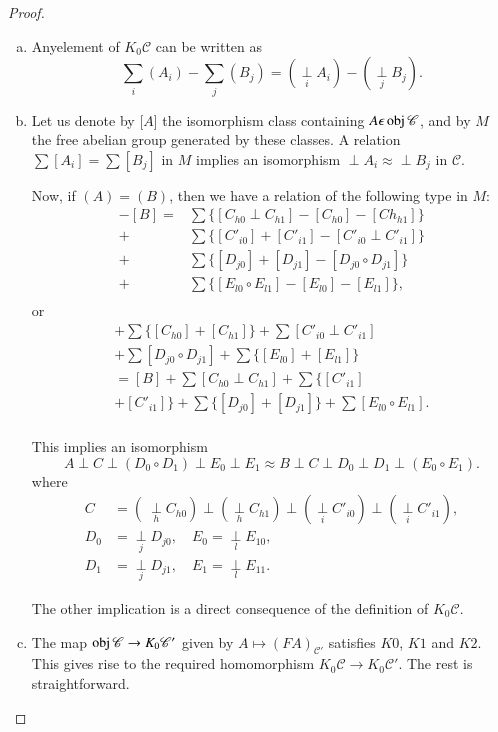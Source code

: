 \begin{proof}
\begin{enumerate}[(a)]
\item Any\pageoriginale element of $K_0 \mathscr{C}$ can be written as
$$ \sum\limits_i (A_i) - \sum\limits_j (B_j) = ( \underset{i}\perp A_i
  ) - (\underset{j} \perp B_j).
$$
 
\item Let us denote by [$A$] the isomorphism class containing $A
  \epsilon \operatorname{obj} \mathscr{C}$, and by $M$ the free abelian group
  generated by these classes. A relation $\sum [A_i] = \sum [B_j]$ in
  $M$ implies an isomorphism $\perp A_i \approx \perp B_j$ in
  $\mathscr{C}$. 

Now, if $(A) = (B)$, then we have a relation of the following type in  
$M$: 
\begin{align*}
[A] - [B] = & \sum \{ [ C_{h0} \perp C_{h1}] - [C_{h0}] - [Ch_{h1}] \} \\
+ & \sum \{ [ C'_{i0}] + [C'_{i1}] - [C'_{i0} \perp C'_{i1}] \} \\
+ & \sum \{ [ D_{j0}] + [D_{j1}] - [D_{j0} \circ D_{j1}] \} \\
+ & \sum \{ [ E_{l0} \circ E_{l1}] - [E_{l0}] - [E_{l1}] \}, \\
\end{align*}
or 
\begin{gather*}
[A]  + \sum \{ [ C_{h0}] +[C_{h1}]\} + \sum[C'_{i0} \perp C'_{i1}]\\
+
\sum[D_{j0} \circ D_{j1}] + \sum \{[E_{l0}] + [E_{l1}]\}  \\ 
= [B]  + \sum[ C_{h0} \perp C_{h1}] + \sum \{[C'_{i1}]\\ + [C'_{i1}]\}+
\sum\{[D_{j0}] +[D_{j1}] \} + \sum [E_{l0} \circ E_{l1}].  \\ 
\end{gather*}

This implies an isomorphism
$$
A \perp C \perp (D_0 \circ D_1) \perp E_0 \perp E_1 \approx B \perp C 
\perp D_0 \perp D_1 \perp (E_0 \circ E_1). 
$$
where\pageoriginale
\begin{align*}
C & = (~ \underset{h}\perp C_{h0}) \perp (\underset{h}\perp C_{h1})
\perp (\underset{i}\perp C'_{i0}) \perp (\underset{i}\perp C'_{i1}),
\\ 
D_0 & = \underset{j}\perp D_{j0}, \quad   E_0 = \underset{l}\perp
E_{10},\\ 
D_1 & = \underset{j}\perp D_{j1}, \quad   E_1 = \underset{l}\perp
E_{11}.
\end{align*}

The other implication is a direct consequence of the definition of
$K_0 \mathscr{C}$. 

\item The map $\operatorname{obj} \mathscr{C} \to K_0 \mathscr{C}'$ given by $A
  \longmapsto (FA)_{\mathscr{C'}}$ satisfies $K0$, $K1$ and $K2$. This
  gives rise to the required homomorphism $K_0 \mathscr{C} \to K_0
  \mathscr{C'}$. The rest is straightforward. 
\end{enumerate}
\end{proof}

